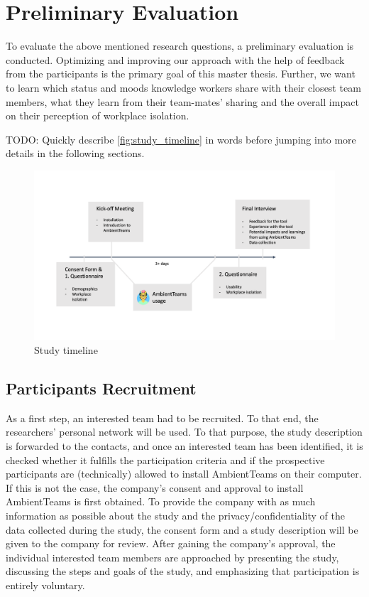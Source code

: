 \chapter{Preliminary Evaluation}
\label{chapter:preliminary_evaluation}
To evaluate the above mentioned research questions, a preliminary evaluation is conducted. Optimizing and improving our approach with the help of feedback from the participants is the primary goal of this master thesis. Further, we want to learn which status and moods knowledge workers share with their closest team members, what they learn from their team-mates' sharing and the overall impact on their perception of workplace isolation.

TODO: Quickly describe \autoref{fig:study_timeline} in words before jumping into more details in the following sections.

\begin{figure}[h]
    \centering
    \includegraphics[width=.8\linewidth]{./images/Study_Timeline.png}
    \caption{Study timeline}
    \label{fig:study_timeline}
\end{figure}

\section{Participants Recruitment}
\label{section:recruitment}
As a first step, an interested team had to be recruited. To that end, the researchers' personal network will be used. To that purpose, the study description is forwarded to the contacts, and once an interested team has been identified, it is checked whether it fulfills the participation criteria and if the prospective participants are (technically) allowed to install AmbientTeams on their computer. If this is not the case, the company's consent and approval to install AmbientTeams is first obtained. To provide the company with as much information as possible about the study and the privacy/confidentiality of the data collected during the study, the consent form and a study description will be given to the company for review. After gaining the company's approval, the individual interested team members are approached by presenting the study, discussing the steps and goals of the study, and emphasizing that participation is entirely voluntary.

